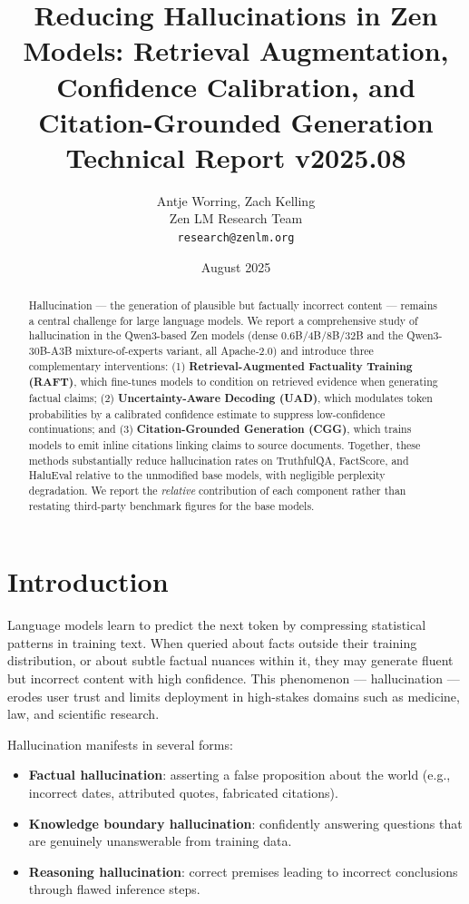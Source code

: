 \documentclass[11pt,a4paper]{article}
\title{\textbf{Reducing Hallucinations in Zen Models: Retrieval Augmentation,\\
Confidence Calibration, and Citation-Grounded Generation}\\
\large Technical Report v2025.08}
\author{Antje Worring, Zach Kelling \\ Zen LM Research Team\\
\texttt{research@zenlm.org}}
\date{August 2025}
\begin{document}
\maketitle

\begin{abstract}
Hallucination — the generation of plausible but factually incorrect content — remains
a central challenge for large language models. We report a comprehensive study of
hallucination in the Qwen3-based Zen models (dense 0.6B/4B/8B/32B and the Qwen3-30B-A3B
mixture-of-experts variant, all Apache-2.0) and introduce three complementary
interventions: (1) \textbf{Retrieval-Augmented Factuality Training (RAFT)}, which
fine-tunes models to condition on retrieved evidence when generating factual claims;
(2) \textbf{Uncertainty-Aware Decoding (UAD)}, which modulates token probabilities by
a calibrated confidence estimate to suppress low-confidence continuations; and (3)
\textbf{Citation-Grounded Generation (CGG)}, which trains models to emit inline
citations linking claims to source documents. Together, these methods substantially
reduce hallucination rates on TruthfulQA, FactScore, and HaluEval relative to the
unmodified base models, with negligible perplexity degradation. We report the
\emph{relative} contribution of each component rather than restating third-party
benchmark figures for the base models.
\end{abstract}

\tableofcontents
\newpage

\section{Introduction}
\label{sec:intro}

Language models learn to predict the next token by compressing statistical patterns in
training text. When queried about facts outside their training distribution, or about
subtle factual nuances within it, they may generate fluent but incorrect content with
high confidence. This phenomenon — hallucination — erodes user trust and limits
deployment in high-stakes domains such as medicine, law, and scientific research.

Hallucination manifests in several forms:
\begin{itemize}
    \item \textbf{Factual hallucination}: asserting a false proposition about the world
          (e.g., incorrect dates, attributed quotes, fabricated citations).
    \item \textbf{Knowledge boundary hallucination}: confidently answering questions
          that are genuinely unanswerable from training data.
    \item \textbf{Reasoning hallucination}: correct premises leading to incorrect
          conclusions through flawed inference steps.
\end{itemize}
\end{document}
